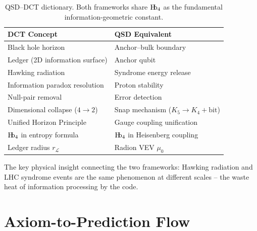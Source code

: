 \documentclass[11pt,a4paper]{article}
\theoremstyle{definition}
\newcommand{\Hb}{\textnormal{H\kern-0.3em b}}
\newcommand{\Hbfour}{\Hb_4}
\newcommand{\murad}{\mu_0}
\newcommand{\LL}{\mathcal{L}}
\begin{document}
\begin{table}[h]
\centering
\begin{tabular}{ll}
\toprule
\textbf{DCT Concept} & \textbf{QSD Equivalent} \\
\midrule
Black hole horizon & Anchor--bulk boundary \\
Ledger (2D information surface) & Anchor qubit \\
Hawking radiation & Syndrome energy release \\
Information paradox resolution & Proton stability \\
Null-pair removal & Error detection \\
Dimensional collapse ($4 \to 2$) & Snap mechanism ($K_5 \to K_4 + \text{bit}$) \\
Unified Horizon Principle & Gauge coupling unification \\
$\Hbfour$ in entropy formula & $\Hbfour$ in Heisenberg coupling \\
Ledger radius $r_\LL$ & Radion VEV $\murad$ \\
\bottomrule
\end{tabular}
\caption{QSD--DCT dictionary. Both frameworks share $\Hbfour$ as the fundamental information-geometric constant.}
\label{tab:dct_dict}
\end{table}

The key physical insight connecting the two frameworks: Hawking radiation and LHC syndrome events are the same phenomenon at different scales -- the waste heat of information processing by the code.

\section{Axiom-to-Prediction Flow}
\label{app:flow}
\end{document}
